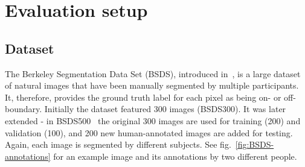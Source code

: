 \section{Evaluation setup}
\subsection{Dataset}
\label{sec:ch5-BSDS500-dataset}
The Berkeley Segmentation Data Set (BSDS), introduced in~\cite{Martin01}, is a large dataset of natural images that have been manually segmented by multiple participants. It, therefore, provides the ground truth label for each pixel as being on- or off-boundary. Initially the dataset featured 300 images (BSDS300). It was later extended - in BSDS500~\cite{Arbelaez11} the original 300 images are used for training (200) and validation (100), and 200 new human-annotated images are added for testing. Again, each image is segmented by different subjects. See fig.~\ref{fig:BSDS-annotations} for an example image and its annotations by two different people.


